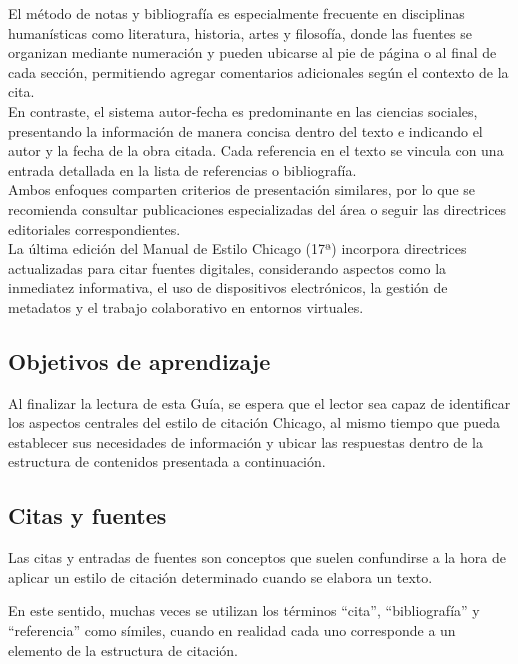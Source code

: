 \documentclass[12pt,a4paper]{article}
\begin{document}
\begin{enumerate}[resume]
El método de notas y bibliografía es especialmente frecuente en disciplinas humanísticas como literatura, historia, artes y filosofía, donde las fuentes se organizan mediante numeración y pueden ubicarse al pie de página o al final de cada sección, permitiendo agregar comentarios adicionales según el contexto de la cita.\\

En contraste, el sistema autor-fecha es predominante en las ciencias sociales, presentando la información de manera concisa dentro del texto e indicando el autor y la fecha de la obra citada. Cada referencia en el texto se vincula con una entrada detallada en la lista de referencias o bibliografía.\\

Ambos enfoques comparten criterios de presentación similares, por lo que se recomienda consultar publicaciones especializadas del área o seguir las directrices editoriales correspondientes.\\

La última edición del Manual de Estilo Chicago (17ª) incorpora directrices actualizadas para citar fuentes digitales, considerando aspectos como la inmediatez informativa, el uso de dispositivos electrónicos, la gestión de metadatos y el trabajo colaborativo en entornos virtuales.\\


\subsection{Objetivos de aprendizaje}
Al finalizar la lectura de esta Guía, se espera que el lector sea capaz de identificar los aspectos centrales del estilo de citación Chicago, al mismo tiempo que pueda establecer sus necesidades de información y ubicar las respuestas dentro de la estructura de contenidos presentada a continuación.

\subsection{Citas y fuentes}
Las citas y entradas de fuentes son conceptos que suelen confundirse a la hora de aplicar un estilo de citación determinado cuando se elabora un texto. 

En este sentido, muchas veces se utilizan los términos \enquote{cita}, \enquote{bibliografía} y \enquote{referencia} como símiles, cuando en realidad cada uno corresponde a un elemento de la estructura de citación. 


\end{enumerate}
\end{document}
